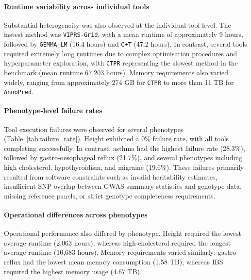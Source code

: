 \documentclass[pdflatex,sn-basic]{sn-jnl}
\begin{document}
\paragraph{Runtime variability across individual tools}

Substantial heterogeneity was also observed at the individual tool level. The fastest method was \texttt{VIPRS-Grid}, with a mean runtime of approximately 9 hours, followed by \texttt{GEMMA-LM} (16.4 hours) and \texttt{C+T} (47.2 hours). In contrast, several tools required extremely long runtimes due to complex optimisation procedures and hyperparameter exploration, with \texttt{CTPR} representing the slowest method in the benchmark (mean runtime 67,203 hours). Memory requirements also varied widely, ranging from approximately 274 GB for \texttt{CTPR} to more than 11 TB for \texttt{AnnoPred}.

\paragraph{Phenotype-level failure rates}

Tool execution failures were observed for several phenotypes (Table~\ref{tab:failure_rate}). Height exhibited a 0\% failure rate, with all tools completing successfully. In contrast, asthma had the highest failure rate (28.3\%), followed by gastro-oesophageal reflux (21.7\%), and several phenotypes including high cholesterol, hypothyroidism, and migraine (19.6\%). These failures primarily resulted from software constraints such as invalid heritability estimates, insufficient SNP overlap between GWAS summary statistics and genotype data, missing reference panels, or strict genotype completeness requirements.

\paragraph{Operational differences across phenotypes}

Operational performance also differed by phenotype. Height required the lowest average runtime (2,063 hours), whereas high cholesterol required the longest average runtime (10,683 hours). Memory requirements varied similarly: gastro-reflux had the lowest mean memory consumption (1.58 TB), whereas IBS required the highest memory usage (4.67 TB).
\end{document}
